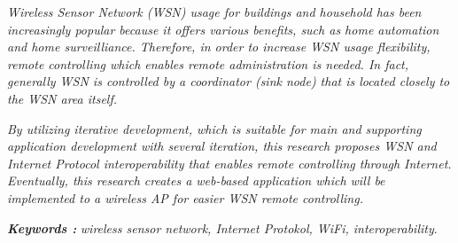 \documentclass{jtetiskripsi}
\begin{document}
\begin{abstracteng}
\emph{
Wireless Sensor Network (WSN) usage for buildings and household has been increasingly popular because it offers various benefits, such as home automation and home surveilliance. Therefore, in order to increase WSN usage flexibility, remote controlling which enables remote administration is needed. In fact, generally WSN is controlled by a coordinator (sink node) that is located closely to the WSN area itself.}

\emph{By utilizing iterative development, which is suitable for main and supporting application development with several iteration, this research proposes WSN and Internet Protocol interoperability that enables remote controlling through Internet. Eventually, this research creates a web-based application which will be implemented to a wireless AP for easier WSN remote controlling.}

\bigskip
\noindent
\textbf{\emph{Keywords :}} \emph{wireless sensor network, Internet Protokol, WiFi, interoperability}.
\end{abstracteng}













\nocite{Erratt2013,Elias2012,widyawan2012ihome,OpenWrtProject2013,Spinar2009,Dunkels2004,wibowo2013wireless,MICRORISCs.r.o.2013,DigiInternationalInc.2013,Gabriel2013,Network2014}

\end{document}
